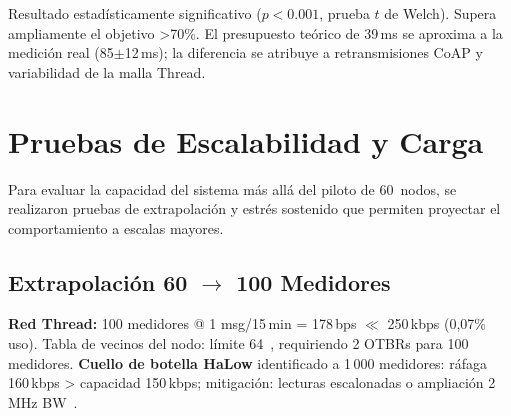 Resultado estadísticamente significativo ($p < 0.001$, prueba $t$ de Welch). Supera ampliamente el objetivo >70\%. El presupuesto teórico de 39\,ms se aproxima a la medición real (85$\pm$12\,ms); la diferencia se atribuye a retransmisiones CoAP y variabilidad de la malla Thread.


\section{Pruebas de Escalabilidad y Carga}
\label{sec:resultados-escalabilidad}

Para evaluar la capacidad del sistema más allá del piloto de 60~nodos, se realizaron pruebas de extrapolación y estrés sostenido que permiten proyectar el comportamiento a escalas mayores.



\subsection{Extrapolación 60 $\rightarrow$ 100 Medidores}
\label{sec:resultados-extrapolacion}

\begin{table}[H]
\centering
\caption{Extrapolación recursos pasarela (60 $\rightarrow$ 100 medidores)}
\label{tab:escalabilidad-gateway}
\end{table}

\textbf{Red Thread:} 100 medidores @ 1 msg/15\,min = 178\,bps $\ll$ 250\,kbps (0,07\% uso). Tabla de vecinos del nodo: límite 64~\cite{ThreadGroup2023}, requiriendo 2 OTBRs para 100 medidores. \textbf{Cuello de botella HaLow} identificado a 1\,000 medidores: ráfaga 160\,kbps > capacidad 150\,kbps; mitigación: lecturas escalonadas o ampliación 2\,MHz BW~\cite{thingsboardEdgeArchitecture2024}.

